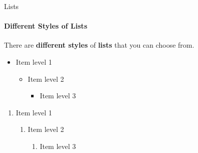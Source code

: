\documentclass[aspectratio=169]{beamer}
\begin{document}
\begin{frame}{Lists}
    \framesubtitle{Different Styles of Lists}

    \begin{coloredblock}[yellow]
        \centering
        There are \textbf{different styles} of \textbf{lists} that you can choose from.
    \end{coloredblock}

    \vspace{-0.5cm}

    \begin{minipage}[t]{0.49\textwidth}
        \begin{coloredblock}
            \begin{itemize}
                \item Item level 1
                \begin{itemize}
                    \item Item level 2
                    \begin{itemize}
                        \item Item level 3
                    \end{itemize}
                \end{itemize}
            \end{itemize}
        \end{coloredblock}

        \begin{coloredblock}
            \begin{enumerate}
            \item Item level 1
                \begin{enumerate}
                    \item Item level 2
                    \begin{enumerate}
                        \item Item level 3
                    \end{enumerate}
                \end{enumerate}
            \end{enumerate}
        \end{coloredblock}
        

\end{minipage}
\end{frame}
\end{document}
